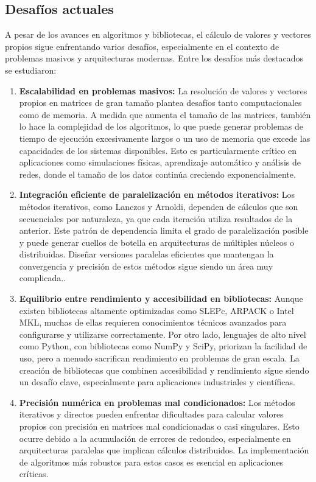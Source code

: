 \documentclass{article}
\begin{document}
\subsection{Desafíos actuales}
A pesar de los avances en algoritmos y bibliotecas, el cálculo de valores y vectores propios sigue enfrentando varios desafíos, especialmente en el contexto de problemas masivos y arquitecturas modernas. Entre los desafíos más destacados se estudiaron:

\begin{enumerate}
    \item \textbf{Escalabilidad en problemas masivos:}
    La resolución de valores y vectores propios en matrices de gran tamaño plantea desafíos tanto computacionales como de memoria. A medida que aumenta el tamaño de las matrices, también lo hace la complejidad de los algoritmos, lo que puede generar problemas de tiempo de ejecución excesivamente largos o un uso de memoria que excede las capacidades de los sistemas disponibles. Esto es particularmente crítico en aplicaciones como simulaciones físicas, aprendizaje automático y análisis de redes, donde el tamaño de los datos continúa creciendo exponencialmente.

    \item \textbf{Integración eficiente de paralelización en métodos iterativos:}
    Los métodos iterativos, como Lanczos y Arnoldi, dependen de cálculos que son secuenciales por naturaleza, ya que cada iteración utiliza resultados de la anterior. Este patrón de dependencia limita el grado de paralelización posible y puede generar cuellos de botella en arquitecturas de múltiples núcleos o distribuidas. Diseñar versiones paralelas eficientes que mantengan la convergencia y precisión de estos métodos sigue siendo un área muy complicada..

    \item \textbf{Equilibrio entre rendimiento y accesibilidad en bibliotecas:}
    Aunque existen bibliotecas altamente optimizadas como SLEPc, ARPACK o Intel MKL, muchas de ellas requieren conocimientos técnicos avanzados para configurarse y utilizarse correctamente. Por otro lado, lenguajes de alto nivel como Python, con bibliotecas como NumPy y SciPy, priorizan la facilidad de uso, pero a menudo sacrifican rendimiento en problemas de gran escala. La creación de bibliotecas que combinen accesibilidad y rendimiento sigue siendo un desafío clave, especialmente para aplicaciones industriales y científicas.

    \item \textbf{Precisión numérica en problemas mal condicionados:}
    Los métodos iterativos y directos pueden enfrentar dificultades para calcular valores propios con precisión en matrices mal condicionadas o casi singulares. Esto ocurre debido a la acumulación de errores de redondeo, especialmente en arquitecturas paralelas que implican cálculos distribuidos. La implementación de algoritmos más robustos para estos casos es esencial en aplicaciones críticas.


\end{enumerate}
\end{document}
